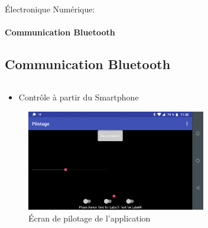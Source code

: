 \documentclass{beamer}
\begin{document}
	\begin{frame}{Électronique Numérique:}
		\framesubtitle{Communication Bluetooth}
		\subsection[Bluetooth]{Communication Bluetooth}
		\begin{columns}[T]
	  		\begin{column}{0.5\textwidth}
		    	\begin{itemize}
		    		\item Contrôle à partir du Smartphone
		    	\end{itemize}
		    	\begin{figure}
		    		\includegraphics[width=0.8\textwidth]{../Illus/AppPilotage.png}
	    			\caption{Écran de pilotage de l'application}
	    		 \end{figure}
	  		\end{column}
	  		\begin{column}{0.5\textwidth}
	  			\begin{figure}

\end{figure}
\end{column}
\end{columns}
\end{frame}
\end{document}
